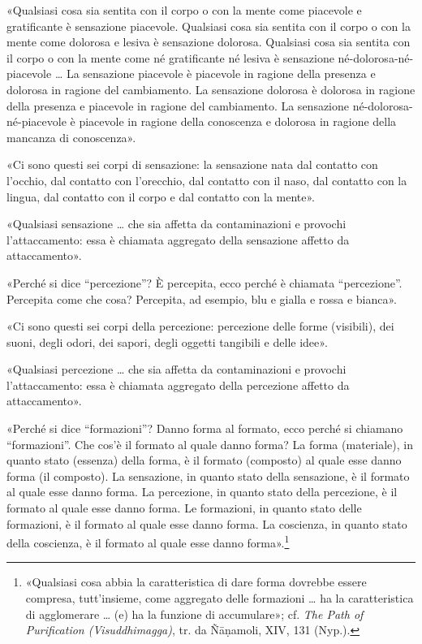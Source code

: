 
«Qualsiasi cosa sia sentita con il corpo o con la mente come piacevole e
gratificante è sensazione piacevole. Qualsiasi cosa sia sentita con il corpo o
con la mente come dolorosa e lesiva è sensazione dolorosa. Qualsiasi cosa sia
sentita con il corpo o con la mente come né gratificante né lesiva è sensazione
né-dolorosa-né-piacevole … La sensazione piacevole è piacevole in ragione della
presenza e dolorosa in ragione del cambiamento. La sensazione dolorosa è
dolorosa in ragione della presenza e piacevole in ragione del cambiamento. La
sensazione né-dolorosa-né-piacevole è piacevole in ragione della conoscenza e
dolorosa in ragione della mancanza di conoscenza».


«Ci sono questi sei corpi di sensazione: la sensazione nata dal contatto con
l’occhio, dal contatto con l’orecchio, dal contatto con il naso, dal contatto
con la lingua, dal contatto con il corpo e dal contatto con la mente».


«Qualsiasi sensazione … che sia affetta da contaminazioni e provochi
l’attaccamento: essa è chiamata aggregato della sensazione affetto da
attaccamento».


«Perché si dice “percezione”? È percepita, ecco perché è chiamata “percezione”.
Percepita come che cosa? Percepita, ad esempio, blu e gialla e rossa e bianca».


«Ci sono questi sei corpi della percezione: percezione delle forme (visibili),
dei suoni, degli odori, dei sapori, degli oggetti tangibili e delle idee».


«Qualsiasi percezione … che sia affetta da contaminazioni e provochi
l’attaccamento: essa è chiamata aggregato della percezione affetto da
attaccamento».


«Perché si dice “formazioni”? Danno forma al formato, ecco perché si chiamano
“formazioni”. Che cos’è il formato al quale danno forma? La forma (materiale),
in quanto stato (essenza) della forma, è il formato (composto) al quale esse
danno forma (il composto). La sensazione, in quanto stato della sensazione, è il
formato al quale esse danno forma. La percezione, in quanto stato della
percezione, è il formato al quale esse danno forma. Le formazioni, in quanto
stato delle formazioni, è il formato al quale esse danno forma. La coscienza, in
quanto stato della coscienza, è il formato al quale esse danno
forma».\footnote{«Qualsiasi cosa abbia la caratteristica di dare forma dovrebbe
  essere compresa, tutt’insieme, come aggregato delle formazioni … ha la
  caratteristica di agglomerare … (e) ha la funzione di accumulare»; cf.
  \emph{The Path of Purification (Visuddhimagga)}, tr. da Ñāṇamoli, XIV, 131
  (Nyp.).}

